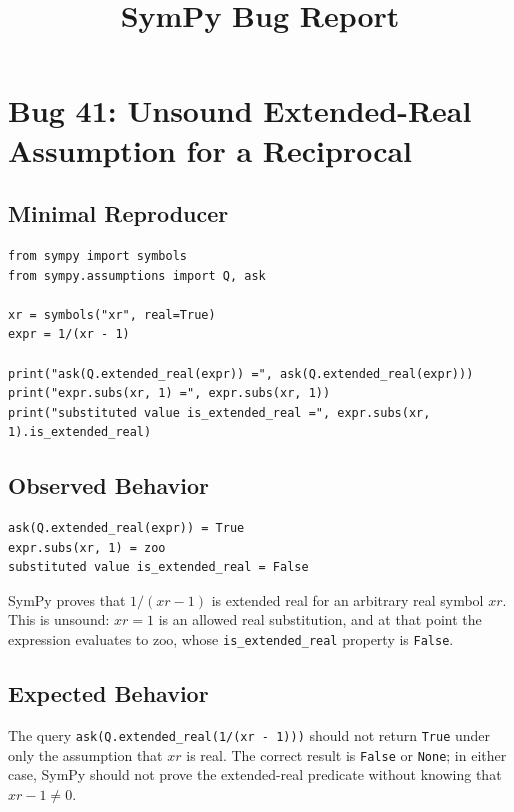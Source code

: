 \documentclass[11pt]{article}
\title{SymPy Bug Report}
\author{}
\date{}
\begin{document}
\maketitle

\section{Bug 41: Unsound Extended-Real Assumption for a Reciprocal}

\subsection{Minimal Reproducer}

\medskip

\begin{lstlisting}[style=bugpython]
from sympy import symbols
from sympy.assumptions import Q, ask

xr = symbols("xr", real=True)
expr = 1/(xr - 1)

print("ask(Q.extended_real(expr)) =", ask(Q.extended_real(expr)))
print("expr.subs(xr, 1) =", expr.subs(xr, 1))
print("substituted value is_extended_real =", expr.subs(xr, 1).is_extended_real)
\end{lstlisting}

\subsection{Observed Behavior}

\medskip

\begin{lstlisting}[style=bugpython]
ask(Q.extended_real(expr)) = True
expr.subs(xr, 1) = zoo
substituted value is_extended_real = False
\end{lstlisting}

SymPy proves that \(1/(xr - 1)\) is extended real for an arbitrary real symbol
\(xr\).  This is unsound: \(xr=1\) is an allowed real substitution, and at that
point the expression evaluates to \(\mathrm{zoo}\), whose
\texttt{is\_extended\_real} property is \texttt{False}.

\subsection{Expected Behavior}

The query \texttt{ask(Q.extended\_real(1/(xr - 1)))} should not return
\texttt{True} under only the assumption that \(xr\) is real.  The correct result
is \texttt{False} or \texttt{None}; in either case, SymPy should not prove the
extended-real predicate without knowing that \(xr-1\neq 0\).
\end{document}
